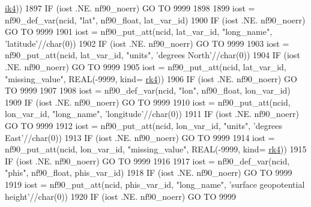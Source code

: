 \begin{DoxyCode}
      \hyperlink{namespaceportable_aa110cf333432508140602ea192c4b2ea}{ik4}))
1897     \textcolor{keywordflow}{IF} (iost .NE. nf90\_noerr) \textcolor{keywordflow}{GO TO} 9999
1898 
1899     iost    = nf90\_def\_var(ncid, \textcolor{stringliteral}{"lat"}, nf90\_float, lat\_var\_id)
1900     \textcolor{keywordflow}{IF} (iost .NE. nf90\_noerr) \textcolor{keywordflow}{GO TO} 9999
1901     iost    = nf90\_put\_att(ncid, lat\_var\_id, \textcolor{stringliteral}{"long\_name"}, \textcolor{stringliteral}{'latitude'}//char(0))
1902     \textcolor{keywordflow}{IF} (iost .NE. nf90\_noerr) \textcolor{keywordflow}{GO TO} 9999
1903     iost    = nf90\_put\_att(ncid, lat\_var\_id, \textcolor{stringliteral}{"units"}, \textcolor{stringliteral}{'degrees North'}//char(0))
1904     \textcolor{keywordflow}{IF} (iost .NE. nf90\_noerr) \textcolor{keywordflow}{GO TO} 9999
1905     iost    = nf90\_put\_att(ncid, lat\_var\_id, \textcolor{stringliteral}{"missing\_value"}, \textcolor{keywordtype}{REAL}(-9999, kind=
      \hyperlink{namespaceportable_abaed22a509442771d3fba69bebda0b33}{rk4}))
1906     \textcolor{keywordflow}{IF} (iost .NE. nf90\_noerr) \textcolor{keywordflow}{GO TO} 9999
1907 
1908     iost    = nf90\_def\_var(ncid, \textcolor{stringliteral}{"lon"}, nf90\_float, lon\_var\_id)
1909     \textcolor{keywordflow}{IF} (iost .NE. nf90\_noerr) \textcolor{keywordflow}{GO TO} 9999
1910     iost    = nf90\_put\_att(ncid, lon\_var\_id, \textcolor{stringliteral}{"long\_name"}, \textcolor{stringliteral}{'longitude'}//char(0))
1911     \textcolor{keywordflow}{IF} (iost .NE. nf90\_noerr) \textcolor{keywordflow}{GO TO} 9999
1912     iost    = nf90\_put\_att(ncid, lon\_var\_id, \textcolor{stringliteral}{"units"}, \textcolor{stringliteral}{'degrees East'}//char(0))
1913     \textcolor{keywordflow}{IF} (iost .NE. nf90\_noerr) \textcolor{keywordflow}{GO TO} 9999
1914     iost    = nf90\_put\_att(ncid, lon\_var\_id, \textcolor{stringliteral}{"missing\_value"}, \textcolor{keywordtype}{REAL}(-9999, kind=
      \hyperlink{namespaceportable_abaed22a509442771d3fba69bebda0b33}{rk4}))
1915     \textcolor{keywordflow}{IF} (iost .NE. nf90\_noerr) \textcolor{keywordflow}{GO TO} 9999
1916 
1917     iost    = nf90\_def\_var(ncid, \textcolor{stringliteral}{"phis"}, nf90\_float, phis\_var\_id)
1918     \textcolor{keywordflow}{IF} (iost .NE. nf90\_noerr) \textcolor{keywordflow}{GO TO} 9999
1919     iost    = nf90\_put\_att(ncid, phis\_var\_id, \textcolor{stringliteral}{"long\_name"}, \textcolor{stringliteral}{'surface geopotential height'}//char(0))
1920     \textcolor{keywordflow}{IF} (iost .NE. nf90\_noerr) \textcolor{keywordflow}{GO TO} 9999

\end{DoxyCode}
